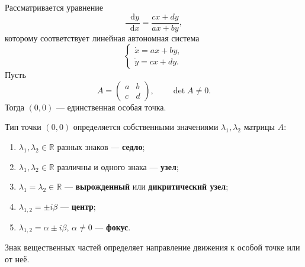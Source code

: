 \documentclass[12pt,a4paper]{article}
\numberwithin{equation}{section}
\newcommand{\R}{\mathbb{R}}
\newcommand{\dd}{\mathop{}\!\mathrm{d}}
\begin{document}
Рассматривается уравнение
\[
\frac{\dd y}{\dd x}=\frac{cx+dy}{ax+by},
\]
которому соответствует линейная автономная система
\[
\begin{cases}
\dot x=ax+by,\\
\dot y=cx+dy.
\end{cases}
\]
Пусть
\[
A=\begin{pmatrix}a&b\\c&d\end{pmatrix},
\qquad \det A\neq0.
\]
Тогда $(0,0)$ --- единственная особая точка.

\begin{theoremHSE}
Тип точки $(0,0)$ определяется собственными значениями $\lambda_1,\lambda_2$ матрицы $A$:
\begin{enumerate}
  \item $\lambda_1,\lambda_2\in\R$ разных знаков --- \textbf{седло};
  \item $\lambda_1,\lambda_2\in\R$ различны и одного знака --- \textbf{узел};
  \item $\lambda_1=\lambda_2\in\R$ --- \textbf{вырожденный} или \textbf{дикритический узел};
  \item $\lambda_{1,2}=\pm i\beta$ --- \textbf{центр};
  \item $\lambda_{1,2}=\alpha\pm i\beta$, $\alpha\neq0$ --- \textbf{фокус}.
\end{enumerate}
Знак вещественных частей определяет направление движения к особой точке или от неё.
\end{theoremHSE}
\end{document}
